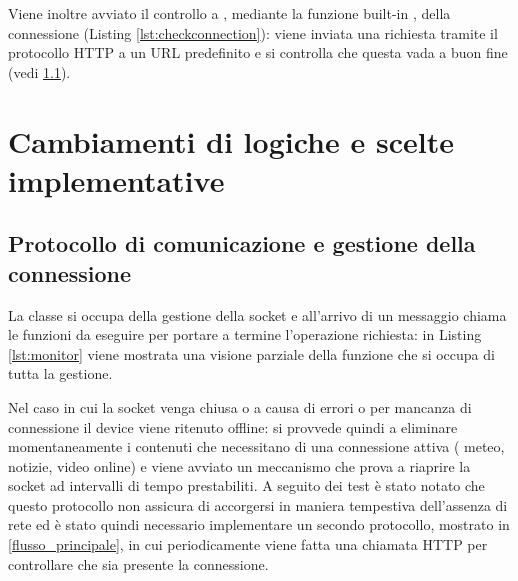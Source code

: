 Viene inoltre avviato il controllo a , mediante la funzione built-in , della connessione (Listing \ref*{lst:checkconnection}): viene inviata una richiesta tramite il protocollo HTTP a un URL predefinito e si controlla che questa vada a buon fine (vedi \ref*{connection}).



\section{Cambiamenti di logiche e scelte implementative}

\subsection{Protocollo di comunicazione e gestione della connessione}\label{connection}


La classe  si occupa della gestione della socket e all'arrivo di un messaggio chiama le funzioni da eseguire per portare a termine l'operazione richiesta: in Listing \ref*{lst:monitor} viene mostrata una visione parziale della funzione  che si occupa di tutta la gestione.



Nel caso in cui la socket venga chiusa o a causa di errori o per mancanza di connessione il device viene ritenuto offline: si provvede quindi a eliminare momentaneamente i contenuti che necessitano di una connessione attiva ( meteo, notizie, video online) e viene avviato un meccanismo che prova a riaprire la socket ad intervalli di tempo prestabiliti.
A seguito dei test è stato notato che questo protocollo non assicura di accorgersi in maniera tempestiva dell'assenza di rete ed è stato quindi necessario implementare un secondo protocollo, mostrato in \ref*{flusso_principale}, in cui periodicamente viene fatta una chiamata HTTP per controllare che sia presente la connessione.

